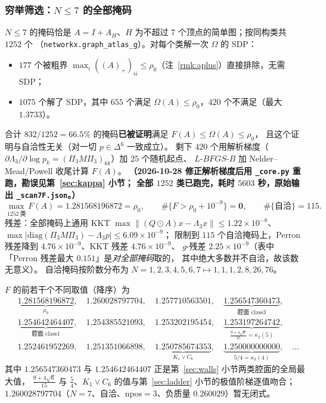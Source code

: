 \documentclass[UTF8,11pt]{ctexart}
\theoremstyle{definition}
\newcommand{\Lam}{\Lambda}
\begin{document}
\subsubsection{穷举筛选：$N\le7$ 的全部掩码}\label{sec:exh7}

$N\le7$ 的掩码恰是 $A=I+A_H$、$H$ 为不超过 $7$ 个顶点的简单图；按同构类共 $1252$ 个
（\texttt{networkx.graph\_atlas\_g}）。对每个类解一次 $\Omega$ 的 SDP：
\begin{itemize}[leftmargin=1.6em,itemsep=1pt]
\item $177$ 个被粗界 $\max_i((A)_+)_{ii}\le\rho_0$（注~\ref{rmk:aplus}）直接排除，无需 SDP；
\item $1075$ 个解了 SDP，其中 $655$ 个满足 $\Omega(A)\le\rho_0$，$420$ 个不满足（最大 $1.3733$）。
\end{itemize}
合计 $832/1252=66.5\%$ 的掩码\textbf{已被证明}满足 $F(A)\le\Omega(A)\le\rho_0$，
且这个证明与自洽性无关（对一切 $p\in\Delta^6$ 一致成立）。
剩下 $420$ 个用解析梯度（$\partial\Lam_3/\partial\log p_k=(\Pi_3M\Pi_3)_{kk}$）加 $25$ 个随机起点、
$L$-$BFGS$-$B$ 加 Nelder--Mead/Powell 收尾计算 $F(A)$。
\textbf{（2026-10-28 修正解析梯度后用 \texttt{\_core.py} 重跑，勘误见第~\ref{sec:kappa} 小节；
全部 $1252$ 类已跑完，耗时 $5603$ 秒，原始输出 \texttt{\_scan7F.json}。）}
\[
\max_{1252\ \text{类}}F(A)=1.281568196872=\rho_0,\qquad
\#\{F>\rho_0+10^{-9}\}=\mathbf 0,\qquad \#\{\text{自洽}\}=115 .
\]
残差：全部掩码上通用 KKT $\max\|(Q\odot A)x-\Lam_3x\|\le1.22\times10^{-8}$、
$\max|\mathrm{diag}(\Pi_3M\Pi_3)-\Lam_3p|\le6.09\times10^{-9}$；
限制到 $115$ 个自洽掩码上，Perron 残差降到 $4.76\times10^{-9}$、KKT 残差 $4.76\times10^{-9}$、
$g$-残差 $2.25\times10^{-9}$（表中「Perron 残差最大 $0.151$」是\emph{对全部掩码}取的，
其中绝大多数并不自洽，故该数无意义）。
自洽掩码按阶数分布为 $N=1,2,3,4,5,6,7\mapsto1,1,1,2,8,26,76$。

$F$ 的前若干个不同取值（降序）为
\[
\begin{aligned}
&\underbrace{1.281568196872}_{\rho_0},\quad 1.260028797704,\quad 1.257710563501,\quad
 \underbrace{1.256547360473}_{\text{腔面 class3}},\\
&\underbrace{1.254642464407}_{\text{腔面 class1}},\quad 1.254385521093,\quad 1.253202195454,\quad
 \underbrace{1.253197264742}_{\frac{9+4\sqrt6}{15}=\kappa_3(5)},\\
&1.252461952269,\quad 1.251351066898,\quad
 \underbrace{1.250785674353}_{K_1\vee C_6},\quad
 \underbrace{1.250000000000}_{5/4=\kappa_3(4)},\quad\ldots
\end{aligned}
\]
其中 $1.256547360473$ 与 $1.254642464407$ 正是第~\ref{sec:walls} 小节两类腔面的全局最大值，
$\frac{9+4\sqrt6}{15}$ 与 $\frac54$、$K_1\vee C_6$ 的值与第~\ref{sec:ladder} 小节的极值阶梯逐值吻合；
$1.260028797704$（$N=7$、自洽、$\mathrm{npos}=3$、负质量 $0.260029$）暂无闭式。
\end{document}
